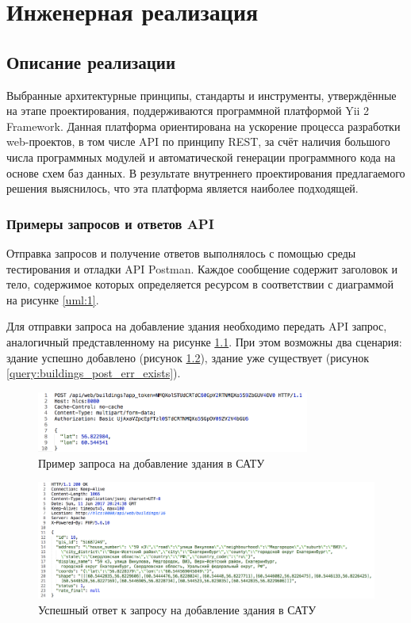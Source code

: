 \chapter{Инженерная реализация}

\section{Описание реализации}

Выбранные архитектурные принципы, стандарты и инструменты, утверждённые на этапе проектирования, поддерживаются программной платформой Yii 2 Framework. Данная платформа ориентирована на ускорение процесса разработки web-проектов, в том числе API по принципу REST, за счёт наличия большого числа программных модулей и автоматической генерации программного кода на основе схем баз данных. В результате внутреннего проектирования предлагаемого решения выяснилось, что эта платформа является наиболее подходящей.

\subsection{Примеры запросов и ответов API}

Отправка запросов и получение ответов выполнялось с помощью среды тестирования и отладки API Postman. Каждое сообщение содержит заголовок и тело, содержимое которых определяется ресурсом в соответствии с диаграммой на рисунке \ref{uml:1}.
	
	Для отправки запроса на добавление здания необходимо передать API запрос, аналогичный представленному на рисунке \ref{query:buildings_post_to}. При этом возможны два сценария: здание успешно добавлено (рисунок \ref{query:buildings_post_from}), здание уже существует (рисунок \ref{query:buildings_post_err_exists}).

	\pagebreak

	\begin{figure}[t!]
		\centering
		\includegraphics[width=0.8\textwidth]{images/queries/buildings_post_to}
		\caption{Пример запроса на добавление здания в САТУ}
		\label{query:buildings_post_to}
	\end{figure}

	\begin{figure}[t!]
		\centering
		\includegraphics[width=1\textwidth]{images/queries/buildings_post_from}
		\caption{Успешный ответ к запросу на добавление здания в САТУ}
		\label{query:buildings_post_from}
	\end{figure}

